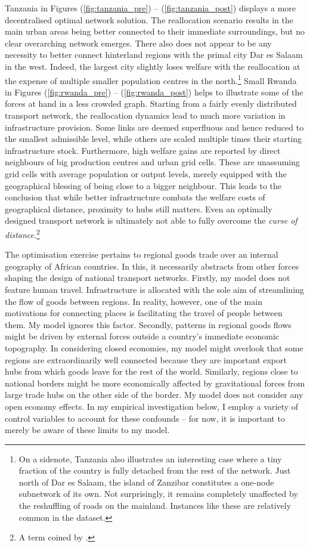 \documentclass[11pt, oneside]{article}   	%
\let\oldref\ref
\renewcommand{\ref}[1]{(\oldref{#1})}
\begin{document}
Tanzania in Figures \ref{fig:tanzania_pre} -- \ref{fig:tanzania_post} displays a more decentralised optimal network solution. The reallocation scenario results in the main urban areas being better connected to their immediate surroundings, but no clear overarching network emerges. There also does not appear to be any necessity to better connect hinterland regions with the primal city Dar es Salaam in the west. Indeed, the largest city slightly loses welfare with the reallocation at the expense of multiple smaller population centres in the north.\footnote{On a sidenote, Tanzania also illustrates an interesting case where a tiny fraction of the country is fully detached from the rest of the network. Just north of Dar es Salaam, the island of Zanzibar constitutes a one-node subnetwork of its own. Not surprisingly, it remains completely unaffected by the reshuffling of roads on the mainland. Instances like these are relatively common in the dataset.} Small Rwanda in Figures \ref{fig:rwanda_pre} -- \ref{fig:rwanda_post} helps to illustrate some of the forces at hand in a less crowded graph. Starting from a fairly evenly distributed transport network, the reallocation dynamics lead to much more variation in infrastructure provision. Some links are deemed superfluous and hence reduced to the smallest admissible level, while others are scaled multiple times their starting infrastructure stock. Furthermore, high welfare gains are reported by direct neighbours of big production centres and urban grid cells. These are unassuming grid cells with average population or output levels, merely equipped with the geographical blessing of being close to a bigger neighbour. This leads to the conclusion that while better infrastructure combats the welfare costs of geographical distance, proximity to hubs still matters. Even an optimally designed transport network is ultimately not able to fully overcome the \emph{curse of distance}.\footnote{A term coined by \cite{Boulhol_Havedevelopedcountries_2010}.}

The optimisation exercise pertains to regional goods trade over an internal geography of African countries. In this, it necessarily abstracts from other forces shaping the design of national transport networks. Firstly, my model does not feature human travel. Infrastructure is allocated with the sole aim of streamlining the flow of goods between regions. In reality, however, one of the main motivations for connecting places is facilitating the travel of people between them. My model ignores this factor. Secondly, patterns in regional goods flows might be driven by external forces outside a country's immediate economic topography. In considering closed economies, my model might overlook that some regions are extraordinarily well connected because they are important export hubs from which goods leave for the rest of the world. Similarly, regions close to national borders might be more economically affected by gravitational forces from large trade hubs on the other side of the border. My model does not consider any open economy effects. In my empirical investigation below, I employ a variety of control variables to account for these confounds -- for now, it is important to merely be aware of these limits to my model.
\end{document}
